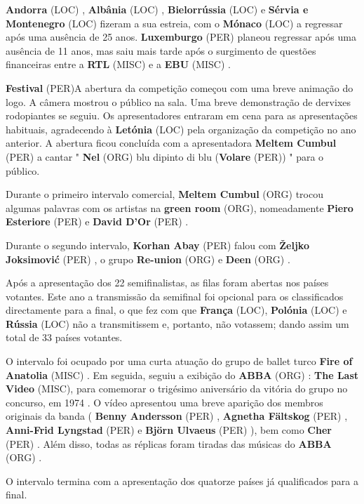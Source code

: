\documentclass[12pt,a4paper]{article}
\begin{document}
\textbf{Andorra} (LOC) , \textbf{Albânia} (LOC) , \textbf{Bielorrússia} (LOC) e \textbf{Sérvia e Montenegro} (LOC) fizeram a sua estreia, com o \textbf{Mónaco} (LOC) a regressar após uma ausência de 25 anos. \textbf{Luxemburgo} (PER) planeou regressar após uma ausência de 11 anos, mas saiu mais tarde após o surgimento de questões financeiras entre a \textbf{RTL} (MISC) e a \textbf{EBU} (MISC) .



\textbf{Festival} (PER)A abertura da competição começou com uma breve animação do logo. A câmera mostrou o público na sala. Uma breve demonstração de dervixes rodopiantes se seguiu. Os apresentadores entraram em cena para as apresentações habituais, agradecendo à \textbf{Letónia} (LOC) pela organização da competição no ano anterior. A abertura ficou concluída com a apresentadora \textbf{Meltem Cumbul} (PER) a cantar " \textbf{Nel} (ORG) blu dipinto di blu (\textbf{Volare} (PER)) " para o público.

Durante o primeiro intervalo comercial, \textbf{Meltem Cumbul} (ORG) trocou algumas palavras com os artistas na \textbf{green room} (ORG), nomeadamente \textbf{Piero Esteriore} (PER) e \textbf{David D'Or} (PER) .

Durante o segundo intervalo, \textbf{Korhan Abay} (PER) falou com \textbf{Željko Joksimović} (PER) , o grupo \textbf{Re-union} (ORG) e \textbf{Deen} (ORG) .

Após a apresentação dos 22 semifinalistas, as filas foram abertas nos países votantes. Este ano a transmissão da semifinal foi opcional para os classificados directamente para a final, o que fez com que \textbf{França} (LOC), \textbf{Polónia} (LOC) e \textbf{Rússia} (LOC) não a transmitissem e, portanto, não votassem; dando assim um total de 33 países votantes.

O intervalo foi ocupado por uma curta atuação do grupo de ballet turco \textbf{Fire of Anatolia} (MISC) . Em seguida, seguiu a exibição do \textbf{ABBA} (ORG) : \textbf{The Last Video} (MISC), para comemorar o trigésimo aniversário da vitória do grupo no concurso, em 1974 . O vídeo apresentou uma breve aparição dos membros originais da banda ( \textbf{Benny Andersson} (PER) , \textbf{Agnetha Fältskog} (PER) , \textbf{Anni-Frid Lyngstad} (PER) e \textbf{Björn Ulvaeus} (PER) ), bem como \textbf{Cher} (PER) . Além disso, todas as réplicas foram tiradas das músicas do \textbf{ABBA} (ORG) .

O intervalo termina com a apresentação dos quatorze países já qualificados para a final.
\end{document}
